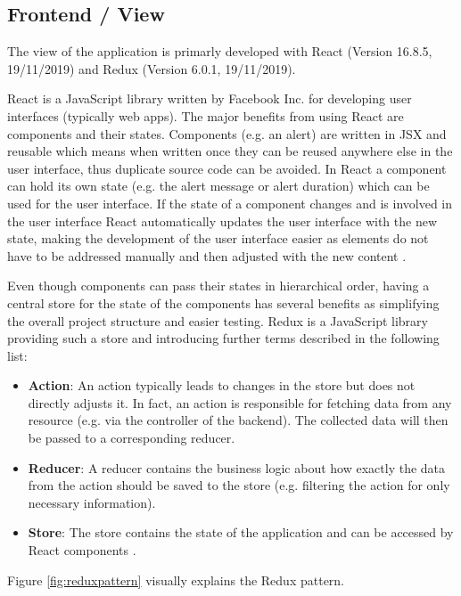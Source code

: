 \subsection{Frontend / View}
\label{sec:DomainCb}

The view of the application is primarly developed with React (Version 16.8.5, 19/11/2019) and Redux (Version 6.0.1, 19/11/2019).

React is a JavaScript library written by Facebook Inc. for developing user interfaces (typically web apps). The major benefits from using React are components and their states. Components (e.g. an alert) are written in \ac{JSX} and reusable which means when written once they can be reused anywhere else in the user interface, thus duplicate source code can be avoided. In React a component can hold its own state (e.g. the alert message or alert duration) which can be used for the user interface. If the state of a component changes and is involved in the user interface React automatically updates the user interface with the new state, making the development of the user interface easier as elements do not have to be addressed manually and then adjusted with the new content \cite[p. 7-8]{stefanovDurchstartenMitReact2017}.

Even though components can pass their states in hierarchical order, having a central store for the state of the components has several benefits as simplifying the overall project structure and easier testing. Redux is a JavaScript library providing such a store and introducing further terms described in the following list:

\begin{itemize}
	\item \textbf{Action}: An action typically leads to changes in the store but does not directly adjusts it. In fact, an action is responsible for fetching data from any resource (e.g. via the controller of the backend). The collected data will then be passed to a corresponding reducer.
	\item \textbf{Reducer}: A reducer contains the business logic about how exactly the data from the action should be saved to the store (e.g. filtering the action for only necessary information).
	\item \textbf{Store}: The store contains the state of the application and can be accessed by React components \cite[p. 531-534]{freemanProReact162019}. 
\end{itemize}

Figure \ref{fig:reduxpattern} visually explains the Redux pattern.

